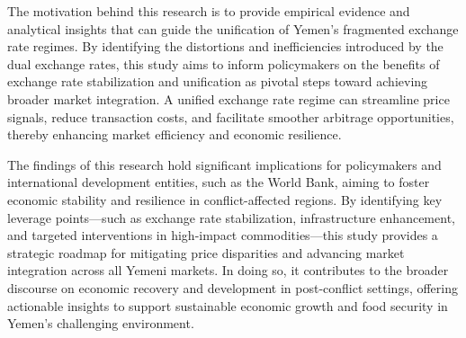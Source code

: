 The motivation behind this research is to provide empirical evidence and analytical insights that can guide the unification of Yemen’s fragmented exchange rate regimes. By identifying the distortions and inefficiencies introduced by the dual exchange rates, this study aims to inform policymakers on the benefits of exchange rate stabilization and unification as pivotal steps toward achieving broader market integration. A unified exchange rate regime can streamline price signals, reduce transaction costs, and facilitate smoother arbitrage opportunities, thereby enhancing market efficiency and economic resilience.

The findings of this research hold significant implications for policymakers and international development entities, such as the World Bank, aiming to foster economic stability and resilience in conflict-affected regions. By identifying key leverage points—such as exchange rate stabilization, infrastructure enhancement, and targeted interventions in high-impact commodities—this study provides a strategic roadmap for mitigating price disparities and advancing market integration across all Yemeni markets. In doing so, it contributes to the broader discourse on economic recovery and development in post-conflict settings, offering actionable insights to support sustainable economic growth and food security in Yemen’s challenging environment.